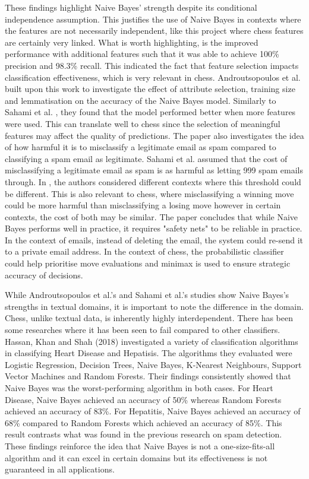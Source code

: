 These findings highlight Naive Bayes' strength despite its conditional independence assumption. This justifies the use of Naive Bayes in contexts where the features are not necessarily independent, like this project where chess features are certainly very linked. What is worth highlighting, is the improved performance with additional features such that it was able to achieve 100\% precision and 98.3\% recall. This indicated the fact that feature selection impacts classification effectiveness, which is very relevant in chess. Androutsopoulos et al. \cite{androutsopoulosEvaluationNaiveBayesian2000} built upon this work to investigate the effect of attribute selection, training size and lemmatisation on the accuracy of the Naive Bayes model. Similarly to Sahami et al. \cite{sahamiBayesianApproachFiltering}, they found that the model performed better when more features were used. This can translate well to chess since the selection of meaningful features may affect the quality of predictions. The paper also investigates the idea of how harmful it is to misclassify a legitimate email as spam compared to classifying a spam email as legitimate. Sahami et al. assumed that the cost of misclassifying a legitimate email as spam is as harmful as letting 999 spam emails through. In \cite{androutsopoulosEvaluationNaiveBayesian2000}, the authors considered different contexts where this threshold could be different. This is also relevant to chess, where misclassifying a winning move could be more harmful than misclassifying a losing move however in certain contexts, the cost of both may be similar. The paper concludes that while Naive Bayes performs well in practice, it requires "safety nets" to be reliable in practice. In the context of emails, instead of deleting the email, the system could re-send it to a private email address. In the context of chess, the probabilistic classifier could help prioritise move evaluations and minimax is used to ensure strategic accuracy of decisions. 

While Androutsopoulos et al.'s and Sahami et al.'s studies show Naive Bayes's strengths in textual domains, it is important to note the difference in the domain. Chess, unlike textual data, is inherently highly interdependent. There has been some researches where it has been seen to fail compared to other classifiers. Hassan, Khan and Shah (2018) \cite{ulhassanComparisonMachineLearning2018} investigated a variety of classification algorithms in classifying Heart Disease and Hepatisis. The algorithms they evaluated were Logistic Regression, Decision Trees, Naive Bayes, K-Nearest Neighbours, Support Vector Machines and Random Forests. Their findings consistently showed that Naive Bayes was the worst-performing algorithm in both cases. For Heart Disease, Naive Bayes achieved an accuracy of 50\% whereas Random Forests achieved an accuracy of 83\%. For Hepatitis, Naive Bayes achieved an accuracy of 68\% compared to Random Forests which achieved an accuracy of 85\%. This result contrasts what was found in the previous research on spam detection. These findings reinforce the idea that Naive Bayes is not a one-size-fits-all algorithm and it can excel in certain domains but its effectiveness is not guaranteed in all applications. 

